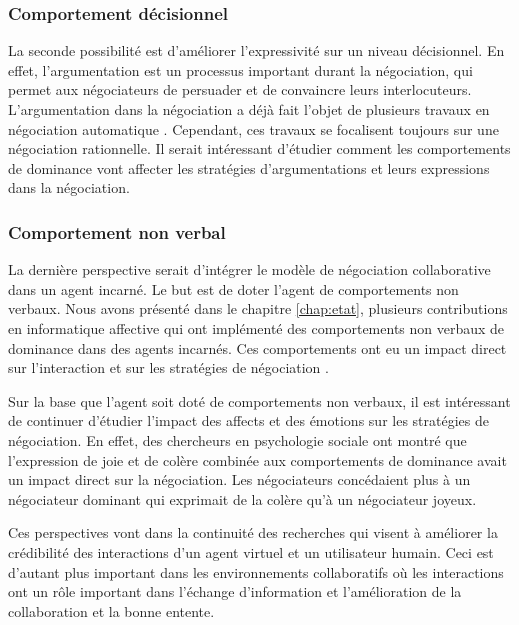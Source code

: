 \subsubsection{Comportement décisionnel}

La seconde possibilité est d'améliorer l'expressivité sur un niveau décisionnel. En effet, l'argumentation est un processus important durant la négociation, qui permet aux négociateurs de persuader et de convaincre leurs interlocuteurs. L'argumentation dans la négociation a déjà fait l'objet de plusieurs travaux en négociation automatique \cite{toni2010argumentative,oliva2010argumentation}. Cependant, ces travaux se focalisent toujours sur une négociation rationnelle. Il serait intéressant d'étudier comment les comportements de dominance vont affecter les stratégies d'argumentations et leurs expressions dans la négociation.

\subsubsection{Comportement non verbal}

La dernière perspective serait d'intégrer le modèle de négociation collaborative dans un agent incarné. Le but est de doter l'agent de comportements non verbaux. Nous avons présenté dans le chapitre \ref{chap:etat}, plusieurs contributions en informatique affective qui ont implémenté des comportements non verbaux de dominance dans des agents incarnés. Ces comportements ont eu un impact direct sur l'interaction et sur les stratégies de négociation \cite{de2011effect,de2015humans}. 

Sur la base que l'agent soit doté de comportements non verbaux, il est intéressant de continuer d'étudier l'impact des affects et des émotions sur les stratégies de négociation.  En effet, des chercheurs en psychologie sociale \cite{van2006power} ont montré que l'expression de  joie et de colère combinée aux comportements de dominance avait un impact direct sur la négociation. Les négociateurs concédaient plus à un négociateur dominant qui exprimait de la colère qu'à un négociateur joyeux. 

Ces perspectives vont dans la continuité des recherches qui visent à améliorer la crédibilité des interactions d'un agent virtuel et un utilisateur humain. Ceci est d'autant plus important dans les environnements collaboratifs où les interactions ont un rôle important dans l'échange d'information et l'amélioration de la collaboration et la bonne entente.  

	
	
	 
	
	
	